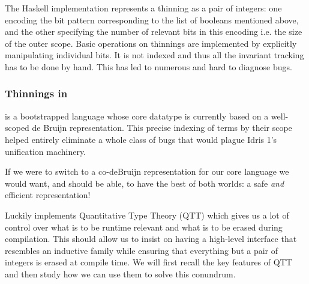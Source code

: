 The Haskell implementation represents a thinning as a pair of integers: one encoding
the bit pattern corresponding to the list of booleans mentioned above, and the other
specifying the number of relevant bits in this encoding i.e. the size of the outer scope.
%
Basic operations on thinnings are implemented by explicitly manipulating individual bits.
%
It is not indexed and thus all the invariant tracking has to be done by hand.
This has led to numerous and hard to diagnose bugs.

\subsubsection{Thinnings in \idris}

\idris{} is a bootstrapped language whose core datatype is currently based on
a well-scoped de Bruijn representation.
%
This precise indexing of terms by their scope helped entirely eliminate a whole
class of bugs that would plague Idris 1's unification machinery.

If we were to switch to a co-deBruijn representation for our core language we
would want, and should be able, to have the best of both worlds:
a safe \emph{and} efficient representation!

Luckily \idris{} implements Quantitative Type Theory (QTT) which gives us a
lot of control over what is to be runtime relevant and what is to be erased
during compilation.
%
This should allow us to insist on having a high-level interface that resembles
an inductive family while ensuring that everything but a pair of integers is erased
at compile time.
%
We will first recall the key features of QTT and then study how we can use them
to solve this conundrum.
